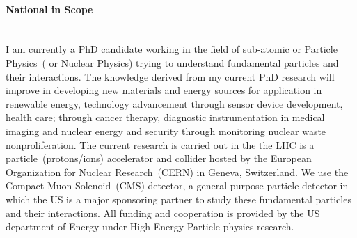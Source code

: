 \documentclass[12pt]{article}
\begin{document}
\paragraph{National in Scope} \mbox{}\\
I am currently a PhD candidate working in the field of sub-atomic or Particle Physics~( or Nuclear Physics) trying to understand fundamental particles and their interactions. The knowledge derived from my current PhD research will improve in developing new materials and energy sources for application in renewable energy, technology advancement through sensor device development, health care; through cancer therapy, diagnostic instrumentation in medical imaging  and nuclear energy and security through monitoring nuclear waste nonproliferation. The current research is carried out in the the LHC is a particle~(protons/ions) accelerator and collider hosted by the European Organization for Nuclear Research~(CERN) in Geneva, Switzerland. We use the  Compact Muon Solenoid~(CMS) detector, a general-purpose particle detector in which the US is a major sponsoring partner to study these fundamental particles and their interactions. All funding and cooperation is provided by the US department of Energy under High Energy Particle physics research.
\end{document}
